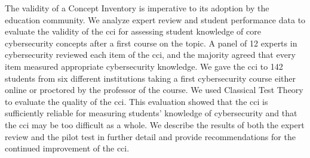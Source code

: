 The validity of a Concept Inventory is imperative to its adoption by the education community. We analyze expert review and student performance data to evaluate the validity of the \gls{cci} for assessing student knowledge of core cybersecurity concepts after a first course on the topic. A panel of 12 experts in cybersecurity reviewed each item of the \gls{cci}, and the majority agreed that every item measured appropriate cybersecurity knowledge. We gave the \gls{cci} to 142 students from six different institutions taking a first cybersecurity course either online or proctored by the professor of the course. We used Classical Test Theory to evaluate the quality of the \gls{cci}. This evaluation showed that the \gls{cci} is sufficiently reliable for measuring students' knowledge of cybersecurity and that the \gls{cci} may be too difficult as a whole. We describe the results of both the expert review and the pilot test in further detail and provide recommendations for the continued improvement of the \gls{cci}.



